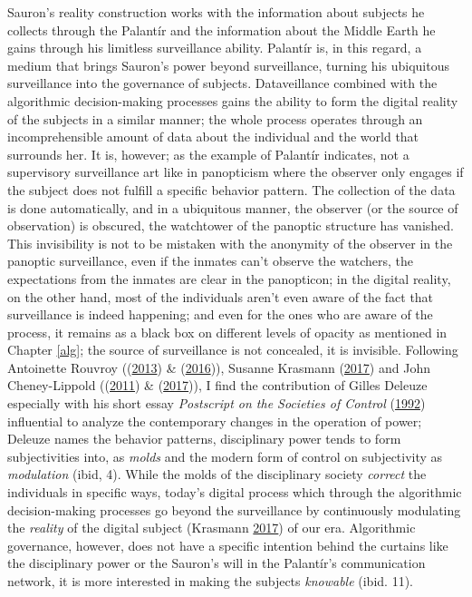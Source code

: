 \documentclass[12pt,twoside]{report}
\begin{document}
Sauron's reality construction works with the information about subjects he collects through the Palantír and the information about the Middle Earth he gains through his limitless surveillance ability. Palantír is, in this regard, a medium that brings Sauron's power beyond surveillance, turning his ubiquitous surveillance into the governance of subjects. Dataveillance combined with the algorithmic decision-making processes gains the ability to form the digital reality of the subjects in a similar manner; the whole process operates through an incomprehensible amount of data about the individual and the world that surrounds her. It is, however; as the example of Palantír indicates, not a supervisory surveillance art like in panopticism where the observer only engages if the subject does not fulfill a specific behavior pattern. The collection of the data is done automatically, and in a ubiquitous manner, the observer (or the source of observation) is obscured, the watchtower of the panoptic structure has vanished. This invisibility is not to be mistaken with the anonymity of the observer in the panoptic surveillance, even if the inmates can't observe the watchers, the expectations from the inmates are clear in the panopticon; in the digital reality, on the other hand, most of the individuals aren't even aware of the fact that surveillance is indeed happening; and even for the ones who are aware of the process, it remains as a black box on different levels of opacity as mentioned in Chapter \ref{alg}; the source of surveillance is not concealed, it is invisible. Following Antoinette Rouvroy ((\protect\hyperlink{ref-Rouvroy2013}{2013}) \& (\protect\hyperlink{ref-Rouvroy2016}{2016})), Susanne Krasmann (\protect\hyperlink{ref-Krasmann2017}{2017}) and John Cheney-Lippold ((\protect\hyperlink{ref-Cheney2011}{2011}) \& (\protect\hyperlink{ref-Cheney2017}{2017})), I find the contribution of Gilles Deleuze especially with his short essay \emph{Postscript on the Societies of Control} (\protect\hyperlink{ref-Deleuze1992}{1992}) influential to analyze the contemporary changes in the operation of power; Deleuze names the behavior patterns, disciplinary power tends to form subjectivities into, as \emph{molds} and the modern form of control on subjectivity as \emph{modulation} (ibid, 4). While the molds of the disciplinary society \emph{correct} the individuals in specific ways, today's digital process which through the algorithmic decision-making processes go beyond the surveillance by continuously modulating the \emph{reality} of the digital subject (Krasmann \protect\hyperlink{ref-Krasmann2017}{2017}) of our era. Algorithmic governance, however, does not have a specific intention behind the curtains like the disciplinary power or the Sauron's will in the Palantír's communication network, it is more interested in making the subjects \emph{knowable} (ibid. 11).
\end{document}
